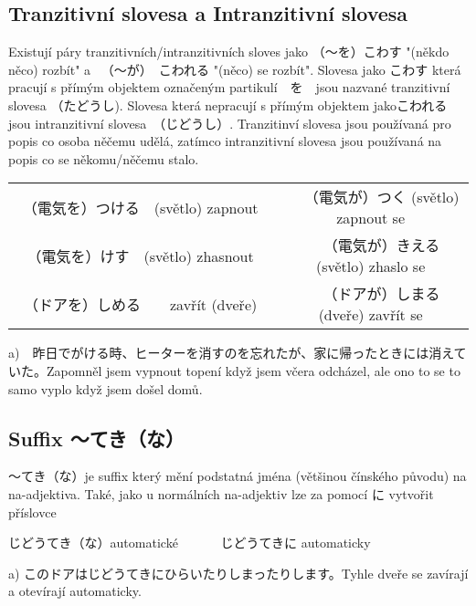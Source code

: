 \subsection{Tranzitivní slovesa a Intranzitivní slovesa}
Existují páry tranzitivních/intranzitivních sloves jako （〜を）こわす "(někdo něco) rozbít" a 　（〜が）　こわれる "(něco) se rozbít". Slovesa jako こわす která pracují s přímým objektem označeným partikulí　を　jsou nazvané tranzitivní slovesa （たどうし). Slovesa která nepracují s přímým objektem jakoこわれる jsou intranzitivní slovesa　（じどうし）. Tranzitinví slovesa jsou používaná pro popis co osoba něčemu udělá, zatímco intranzitivní slovesa jsou používaná na popis co se někomu/něčemu stalo.


\begin{center}
\begin{tabular}{cc}
（電気を）つける　(světlo) zapnout　　　　　&　　（電気が）つく (světlo) zapnout se\\
（電気を）けす　(světlo) zhasnout　　　　　　&　　（電気が）きえる　(světlo) zhaslo se\\
（ドアを）しめる　　zavřít (dveře)　　　　&　　（ドアが）しまる   (dveře) zavřít se\\
\end{tabular}
\end{center}
a)　昨日でがける時、ヒーターを消すのを忘れたが、家に帰ったときには消えていた。Zapomněl jsem vypnout topení když jsem včera odcházel, ale ono to se to samo vyplo když jsem došel domů.




\subsection{Suffix 〜てき（な）}

〜てき（な）je suffix který mění podstatná jména (většinou čínského původu) na na-adjektiva. Také, jako u normálních na-adjektiv lze za pomocí に vytvořit příslovce

じどうてき（な）automatické 　　　じどうてきに automaticky

a) このドアはじどうてきにひらいたりしまったりします。Tyhle dveře se zavírají a otevírají automaticky. 

